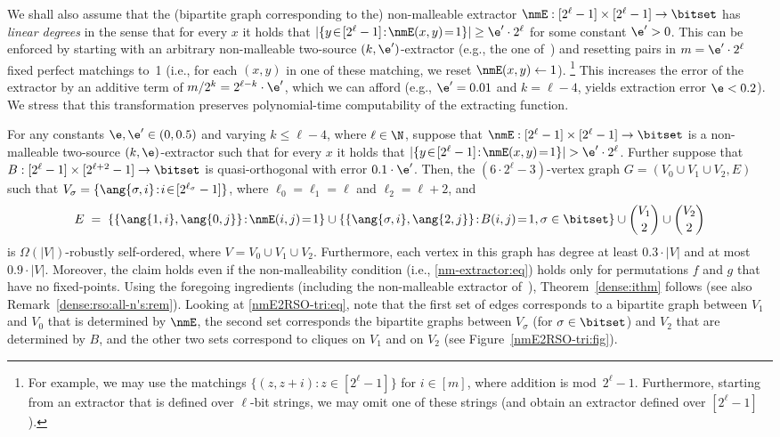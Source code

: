 We shall also assume that the (bipartite graph corresponding to the)
non-malleable extractor ${\nmE}:[2^\ell-1]\times[2^\ell-1]\to\bitset$
has {\em linear degrees}\/ in the sense that for every $x$ it holds that
$|\{y\!\in\![2^\ell-1]\!:\!\nmE(x,y)\!=\!1\}|\geq\e'\cdot2^\ell$
for some constant $\e'>0$.
This can be enforced by starting with an arbitrary
non-malleable two-source $(k,\e')$-extractor
(e.g., the one of~\cite[Thm.~1]{CGL})
and resetting pairs in $m=\e'\cdot2^\ell$ fixed perfect matchings to~1
(i.e., for each $(x,y)$ in one of these matching, we reset $\nmE(x,y)\gets1$).
\footnote{For example, we may use the matchings $\{(z,z+i):z\in[2^\ell-1]\}$
for $i\in[m]$, where addition is mod~$2^\ell-1$.
Furthermore, starting from an extractor that is defined
over $\ell$-bit strings, we may omit one of these strings
(and obtain an extractor defined over $[2^\ell-1]$).}
%
%
%
%
This increases the error of the extractor by an additive
term of $m/2^k=2^{\ell-k}\cdot\e'$, which we can afford
(e.g., $\e'=0.01$ and $k=\ell-4$,
yields extraction error $\e<0.2$).
We stress that this transformation preserves
polynomial-time computability of the extracting function.
%
%
%
%
%
%
%
%
%
%
%
%
%
%
%
%
%
%
%
%
%
%
%

%
%
%
%
%
%
%
\label{nmE2RSO-tri:thm}
%
%
%
%
%
%
For any constants $\e,\e'\in(0,0.5)$ and varying $k\leq\ell-4$,
where $\ell\in\N$,
suppose that ${\nmE}:[2^\ell-1]\times[2^\ell-1]\to\bitset$
is a non-malleable two-source $(k,\e)$-extractor
such that for every $x$ it holds that
$|\{y\!\in\![2^\ell-1]\!:\!\nmE(x,y)\!=\!1\}|>\e'\cdot2^\ell$.
%
Further suppose that $B:[2^\ell-1]\times[2^{\ell+2}-1]\to\bitset$
is quasi-orthogonal with error $0.1\cdot\e'$.
Then, the $(6\cdot2^{\ell}-3)$-vertex graph $G=(V_0\cup V_1\cup V_2,E)$
such that $V_\sigma=\{\ang{\sigma,i}\!:\!i\!\in\![2^{\ell_\sigma}-1]\}$,
where $\ell_0=\ell_1=\ell$ and $\ell_2=\ell+2$,
and
\begin{equation}\label{nmE2RSO-tri:eq}
E\;=\;\left\{\{\ang{1,i},\ang{0,j}\}\!:\!\nmE(i,j)\!=\!1\right\}
\cup\left\{\{
    \ang{\sigma,i},\ang{2,j}\}\!:\!B(i,j)\!=\!1,\sigma\in\bitset
       \right\}
\cup \binom{V_1}{2}
\cup \binom{V_2}{2}
\end{equation}
%
%
is $\Omega(|V|)$-robustly self-ordered, where $V=V_0\cup V_1\cup V_2$.
%
%
%
%
%
%
%
%
%
%
%
Furthermore, each vertex in this graph has degree
at least $0.3\cdot|V|$ and at most $0.9\cdot|V|$.
Moreover, the claim holds even if
the non-malleability condition {\rm(i.e., \eqref{nm-extractor:eq})}
holds only for permutations $f$ and $g$ that have no fixed-points.
\ET
Using the foregoing ingredients
(including the non-malleable extractor of~\cite[Thm.~1]{CGL}),
Theorem~\ref{dense:ithm} follows
(see also Remark~\ref{dense:rso:all-n's:rem}).
%
Looking at \eqref{nmE2RSO-tri:eq}, note that
the first set of edges corresponds to a bipartite
graph between $V_1$ and $V_0$ that is determined by $\nmE$,
the second set corresponds the bipartite graphs
between $V_\sigma$ (for $\sigma\in\bitset$) and $V_2$
that are determined by $B$,
and the other two sets correspond to cliques on $V_1$ and on $V_2$
(see Figure~\ref{nmE2RSO-tri:fig}).
\medskip


